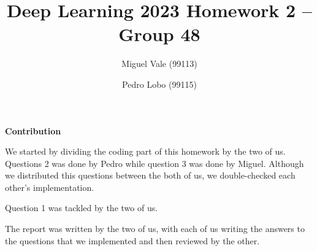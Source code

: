 \documentclass[12pt]{article}
\title{\large{Deep Learning 2023}\vskip 0.2cm Homework 2 -- Group 48}
\date{}
\author{Miguel Vale (99113) \and Pedro Lobo (99115)}
\begin{document}
\maketitle

\center\large{\vskip -1.0cm\textbf{Contribution}}

\begin{justify}
    We started by dividing the coding part of this homework by the two of us. Questions 2 was done by Pedro while question 3 was done by Miguel. Although we distributed this questions between the both of us, we double-checked each other's implementation.

    Question 1 was tackled by the two of us.

    The report was written by the two of us, with each of us writing the answers to the questions that we implemented and then reviewed by the other.
\end{justify}
\end{document}
